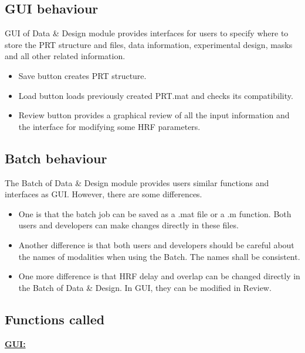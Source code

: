 \subsection{GUI behaviour}

GUI of Data \& Design module provides interfaces for users to specify where to store the PRT structure and files, data information, experimental design, masks and all other related information.

\begin{itemize}
\item Save button creates PRT structure.
\item Load button loads previously created PRT.mat and checks its compatibility.
\item Review button provides a graphical review of all the input information and the interface for modifying some HRF parameters.
\end{itemize}
 

\subsection{Batch behaviour}

The Batch of Data \& Design module provides users similar functions and interfaces as GUI. However, there are some differences.

\begin{itemize}
    \item One is that the batch job can be saved as a .mat file or a .m function. Both users and developers can make changes directly in these files.
    \item Another difference is that both users and developers should be careful about the names of modalities when using the Batch. The names shall be consistent.
    \item One more difference is that HRF delay and overlap can be changed directly in the Batch of Data \& Design. In GUI, they can be modified in Review.
\end{itemize}


\subsection{Functions called}


\textbf{\underline{GUI:}}

